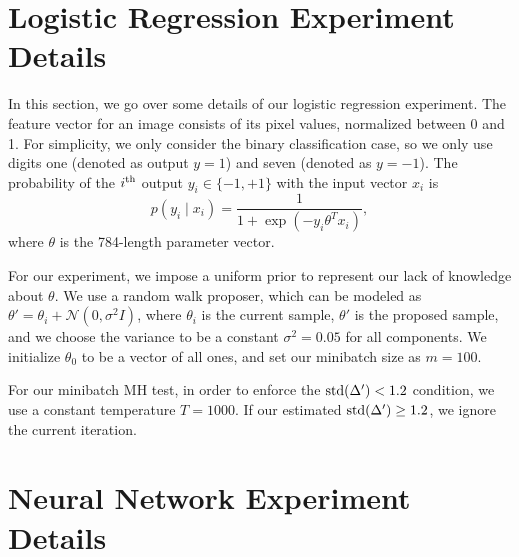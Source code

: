 \documentclass{article}
\begin{document}
\section{Logistic Regression Experiment Details}\label{app:logistic}

In this section, we go over some details of our logistic regression experiment. The feature vector
for an image consists of its pixel values, normalized between 0 and 1. For simplicity, we only
consider the binary classification case, so we only use digits one (denoted as output $y = 1$) and
seven (denoted as $y = -1$). The probability of the $i^{\rm th}$ output $y_i \in \{-1,+1\}$ with the
input vector $x_i$ is
\begin{equation}
p(y_i \mid x_i) = \frac{1}{1+\exp (-y_i \theta^T x_i)},
\end{equation}
where $\theta$ is the 784-length parameter vector.

For our experiment, we impose a uniform prior to represent our lack of knowledge about $\theta$.  We
use a random walk proposer, which can be modeled as $\theta' = \theta_i + \mathcal{N}(0,
\sigma^2I)$, where $\theta_i$ is the current sample, $\theta'$ is the proposed sample, and we choose
the variance to be a constant $\sigma^2 = 0.05$ for all components. We initialize $\theta_0$ to be a
vector of all ones, and set our minibatch size as $m=100$.

For our minibatch MH test, in order to enforce the ${\rm std}(\Delta') < 1.2$ condition, we use a
constant temperature $T = 1000$. If our estimated ${\rm std}(\Delta') \ge 1.2$, we ignore the
current iteration.  %



\iffalse
\section{Neural Network Experiment Details}\label{app:nnet}
\end{document}
